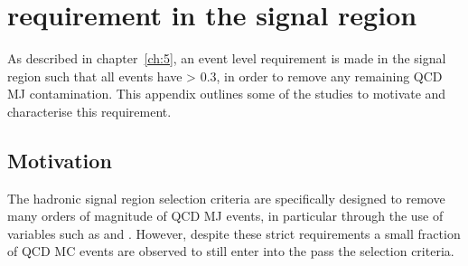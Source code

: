 \chapter{\mindphistar requirement in the signal region}
\label{ch:app_dphistar}

As described in chapter~\ref{ch:5}, an event level requirement is made in the
signal region such that all events have \mindphistar > 0.3, in order to remove
any remaining QCD MJ contamination. This appendix outlines some of
the studies to motivate and characterise this requirement.

\section{Motivation}

The hadronic signal region selection criteria are specifically
designed to remove many orders of magnitude of QCD MJ events, in particular
through the use of variables such as \alphat and \mhtmet.
However, despite these strict requirements a small fraction of QCD MC events are
observed to still enter into the pass the selection criteria.

